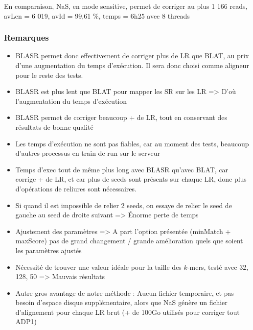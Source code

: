 \documentclass[12pt]{article}
\begin{document}
En comparaison, NaS, en mode sensitive, permet de corriger au plus 1 166 reads, avLen = 6 019, avId = 99,61 \%, temps = 6h25 avec 8 threads

\subsubsection{Remarques}	

\begin{itemize}
	\item BLASR permet donc effectivement de corriger plus de LR que BLAT, au prix d'une augmentation du temps d'exécution. Il sera donc choisi 
		  comme aligneur pour le reste des tests.

	\item BLASR est plus lent que BLAT pour mapper les SR sur les LR => D'où l'augmentation du temps d'exécution

	\item BLASR permet de corriger beaucoup + de LR, tout en conservant des résultats de bonne qualité

	\item Les temps d'exécution ne sont pas fiables, car au moment des tests, beaucoup d'autres processus en train de run sur le serveur
	
	\item Temps d'exec tout de même plus long avec BLASR qu'avec BLAT, car corrige + de LR, et car plus de seeds sont présents sur chaque LR, 
		  donc plus d'opérations de reliures sont nécessaires.
		  
	\item Si quand il est impossible de relier 2 seeds, on essaye de relier le seed de gauche au seed de droite suivant 
		  => Énorme perte de temps
		  
	\item Ajustement des paramètres => A part l'option présentée (minMatch + maxScore) pas de grand changement / grande amélioration quels 
		  que soient les paramètres ajustés
		  
	\item Nécessité de trouver une valeur idéale pour la taille des $k$-mers, testé avec 32, 128, 50 => Mauvais résultats
	
	\item Autre gros avantage de notre méthode : Aucun fichier temporaire, et pas besoin d'espace disque supplémentaire, alors que NaS génère un fichier
		  d'alignement pour chaque LR brut (+ de 100Go utilisés pour corriger tout ADP1)
\end{itemize}
\end{document}
